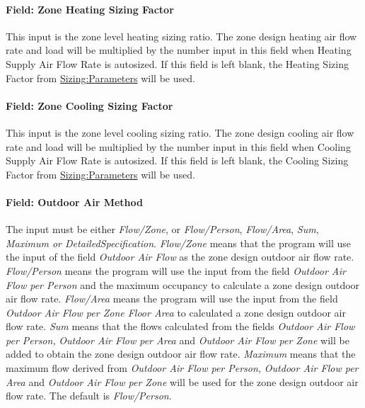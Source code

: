 \paragraph{Field: Zone Heating Sizing Factor}\label{field-zone-heating-sizing-factor-3}

This input is the zone level heating sizing ratio. The zone design heating air flow rate and load will be multiplied by the number input in this field when Heating Supply Air Flow Rate is autosized. If this field is left blank, the Heating Sizing Factor from \hyperref[sizingparameters]{Sizing:Parameters} will be used.

\paragraph{Field: Zone Cooling Sizing Factor}\label{field-zone-cooling-sizing-factor-2}

This input is the zone level cooling sizing ratio. The zone design cooling air flow rate and load will be multiplied by the number input in this field when Cooling Supply Air Flow Rate is autosized. If this field is left blank, the Cooling Sizing Factor from \hyperref[sizingparameters]{Sizing:Parameters} will be used.

\paragraph{Field: Outdoor Air Method}\label{field-outdoor-air-method-4}

The input must be either \emph{Flow/Zone}, or \emph{Flow/Person}, \emph{Flow/Area}, \emph{Sum}, \emph{Maximum or DetailedSpecification}. \emph{Flow/Zone} means that the program will use the input of the field \emph{Outdoor Air Flow} as the zone design outdoor air flow rate. \emph{Flow/Person} means the program will use the input from the field \emph{Outdoor Air Flow per Person} and the maximum occupancy to calculate a zone design outdoor air flow rate. \emph{Flow/Area} means the program will use the input from the field \emph{Outdoor Air Flow per Zone Floor Area} to calculated a zone design outdoor air flow rate. \emph{Sum} means that the flows calculated from the fields \emph{Outdoor Air Flow per Person,} \emph{Outdoor Air Flow per Area} and \emph{Outdoor Air Flow per Zone} will be added to obtain the zone design outdoor air flow rate. \emph{Maximum} means that the maximum flow derived from \emph{Outdoor Air Flow per Person,} \emph{Outdoor Air Flow per Area} and \emph{Outdoor Air Flow per Zone} will be used for the zone design outdoor air flow rate. The default is \emph{Flow/Person}.

